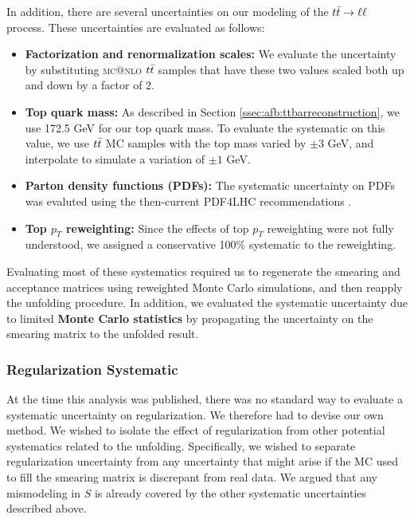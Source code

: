 In addition, there are several uncertainties on our modeling of the
$t\bar{t} \rightarrow \ell\ell$ process. These uncertainties are evaluated as follows:

\begin{itemize}
\item \textbf{Factorization and renormalization scales:} We evaluate
  the uncertainty by substituting \textsc{mc@nlo} $t\bar{t}$ samples that have
  these two values scaled both up and down by a factor of 2.
\item \textbf{Top quark mass:} As described in Section
  \ref{ssec:afb:ttbarreconstruction}, we use 172.5 GeV for our top
  quark mass. To evaluate the systematic on this value, we use
  $t\bar{t}$ MC samples with the top mass varied by $\pm 3$ GeV, and
  interpolate to simulate a variation of $\pm 1$ GeV.
\item \textbf{Parton density functions (PDFs):} The systematic
  uncertainty on PDFs was evaluted using the then-current PDF4LHC
  recommendations \cite{pdf4lhc}.
\item \textbf{Top $p_T$ reweighting:} Since the effects of top $p_T$
  reweighting were not fully understood, we assigned a conservative
  100\% systematic to the reweighting.
\end{itemize}

Evaluating most of these systematics required us to regenerate the
smearing and acceptance matrices using reweighted Monte Carlo
simulations, and then reapply the unfolding procedure. In addition, we
evaluated the systematic uncertainty due to limited \textbf{Monte
  Carlo statistics} by propagating the uncertainty on the smearing
matrix to the unfolded result.

\subsubsection*{Regularization Systematic}

At the time this analysis was published, there was no standard way to
evaluate a systematic uncertainty on regularization. We therefore had
to devise our own method. We wished to isolate the effect of
regularization from other potential systematics related to the
unfolding. Specifically, we wished to separate regularization
uncertainty from any uncertainty that might arise if the MC used to
fill the smearing matrix is discrepant from real data. We argued that
any mismodeling in $S$ is already covered by the other systematic
uncertainties described above.

